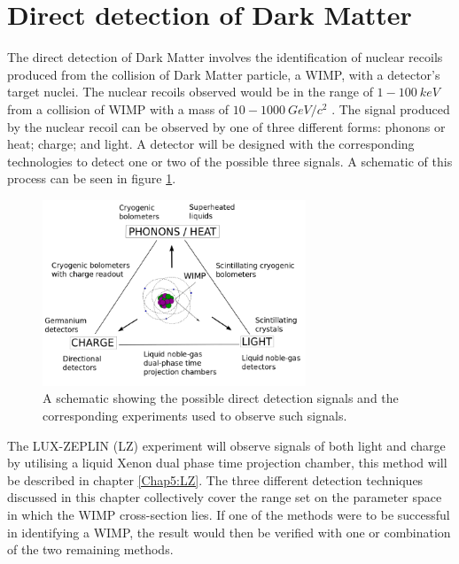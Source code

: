 \section{Direct detection of Dark Matter}\label{sec:directdetection}
The direct detection of Dark Matter involves the identification of nuclear recoils produced from the collision of Dark Matter particle, a WIMP, with a detector's target nuclei. The nuclear recoils observed would be in the range of $1-100\:keV$ from a collision of WIMP with a mass of $10-1000\:GeV/c^2$ \cite{DirectDetection2015}. The signal produced by the nuclear recoil can be observed by one of three different forms: phonons or heat; charge; and light. A detector will be designed with the corresponding technologies to detect one or two of the possible three signals. A schematic of this process can be seen in figure \ref{fig:Direct}.
\begin{figure}[h]
    \centering
    \includegraphics[width=0.7\textwidth]{Figures/Direct_direction.png}
    \caption{A schematic showing the possible direct detection signals and the corresponding experiments used to observe such signals.\cite{DirectDetection2015}}
    \label{fig:Direct}
\end{figure}
The LUX-ZEPLIN (LZ) experiment will observe signals of both light and charge by utilising a liquid Xenon dual phase time projection chamber, this method will be described in chapter \ref{Chap5:LZ}.
\newline
The three different detection techniques discussed in this chapter collectively cover the range set on the parameter space in which the WIMP cross-section lies. If one of the methods were to be successful in identifying a WIMP, the result would then be verified with one or combination of the two remaining methods.